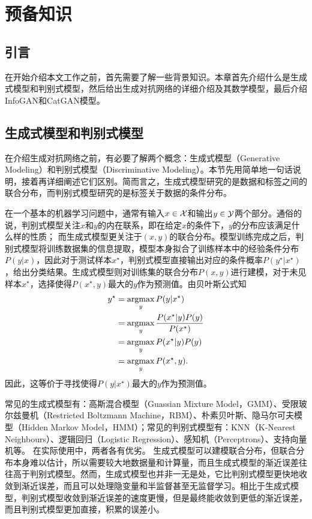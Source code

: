 \chapter{预备知识}\label{chap:preliminaries}
\section{引言}
在开始介绍本文工作之前，首先需要了解一些背景知识。本章首先介绍什么是生成式模型和判别式模型，然后给出生成对抗网络的详细介绍及其数学模型，最后介绍InfoGAN和CatGAN模型。

\section{生成式模型和判别式模型}\label{sec:gm-dm}
在介绍生成对抗网络之前，有必要了解两个概念：生成式模型（Generative Modeling）和判别式模型（Discriminative Modeling）。本节先用简单地一句话说明，接着再详细阐述它们区别。简而言之，生成式模型研究的是数据和标签之间的联合分布，而判别式模型研究的是标签关于数据的条件分布。

在一个基本的机器学习问题中，通常有输入$x \in \mathcal{X}$和输出$y \in \mathcal{Y}$两个部分。通俗的说，判别式模型关注$x$和$y$的内在联系，即在给定$x$的条件下，$y$的分布应该满足什么样的性质；
而生成式模型更关注于$(x, y)$的联合分布。模型训练完成之后，判别式模型将训练数据集的信息提取，模型本身拟合了训练样本中的经验条件分布$P(y|x)$，因此对于测试样本$x^{\star}$，判别式模型直接输出对应的条件概率$P(y^{\star} | x^{\star})$，给出分类结果。生成式模型则对训练集的联合分布$P(x,y)$进行建模，对于未见样本$x^{\star}$，选择使得$P(x^{\star}, y)$最大的$y$作为预测值。由贝叶斯公式知
\[
  \begin{split}
    y^{{\star}} &= \mathop{\text{argmax}}_y P(y|x^{{\star}}) \\
       &= \mathop{\text{argmax}}_y \frac{P(x^{\star}|y)P(y)}{P(x^{\star})} \\
       &= \mathop{\text{argmax}}_y P(x^{\star}|y)P(y) \\
       &= \mathop{\text{argmax}}_y P(x^{\star}, y).
  \end{split}
\]
因此，这等价于寻找使得$P(y|x^{\star})$最大的$y$作为预测值。

常见的生成式模型有：高斯混合模型（Guassian Mixture Model，GMM）、受限玻尔兹曼机（Restricted Boltzmann Machine，RBM）、朴素贝叶斯、隐马尔可夫模型（Hidden Markov Model，HMM）；常见的判别式模型有：KNN（K-Nearest Neighbours）、逻辑回归（Logistic Regression）、感知机（Perceptrons）、支持向量机等。
在实际使用中，两者各有优劣。
生成式模型可以建模联合分布，但联合分布本身难以估计，所以需要较大地数据量和计算量，而且生成式模型的渐近误差往往高于判别式模型。然而，生成式模型也并非一无是处，它比判别式模型更快地收敛到渐近误差，而且可以处理隐变量和半监督甚至无监督学习。相比于生成式模型，判别式模型收敛到渐近误差的速度更慢，但是最终能收敛到更低的渐近误差\citep{ng2002discriminative}，而且判别式模型更加直接，积累的误差小。


